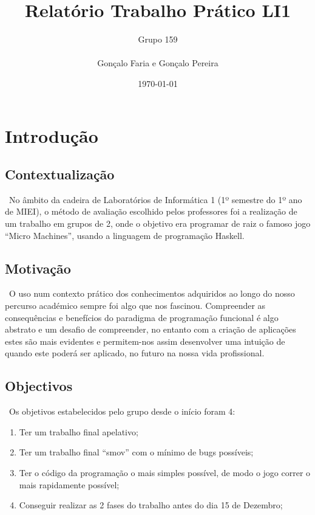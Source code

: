 \documentclass[a4paper]{report} %
\begin{document}
\title{Relatório Trabalho Prático LI1}
\author{Grupo 159\\
\\
Gonçalo Faria e Gonçalo Pereira}
\date{\today}

\maketitle

\tableofcontents



\chapter{Introdução}

  \section{Contextualização}
    \ No âmbito da cadeira de Laboratórios de Informática 1 (1º semestre do 1º ano de MIEI), o método de avaliação escolhido pelos professores foi a realização de um trabalho em grupos de 2, onde o objetivo era programar de raiz o famoso jogo “Micro Machines”, usando a linguagem de programação Haskell.

  \section{Motivação}
    \ O uso num contexto prático dos conhecimentos adquiridos ao longo do nosso percurso académico sempre foi algo que nos fascinou. Compreender as consequências e benefícios do paradigma de programação funcional é algo abstrato e um desafio de compreender, no entanto com a criação de aplicações estes são mais evidentes e permitem-nos assim desenvolver uma intuição de quando este poderá ser aplicado, no futuro na nossa vida profissional.  
  
  \section{Objectivos}
    \ Os objetivos estabelecidos pelo grupo desde o início foram 4:
    \begin{enumerate}
        \item Ter um trabalho final apelativo;
        \item Ter um trabalho final “smov” com o mínimo de bugs possíveis;
        \item Ter o código da programação o mais simples possível, de modo o jogo correr o mais rapidamente possível;
        \item Conseguir realizar as 2 fases do trabalho antes do dia 15 de Dezembro;
    \end{enumerate}
\end{document}
